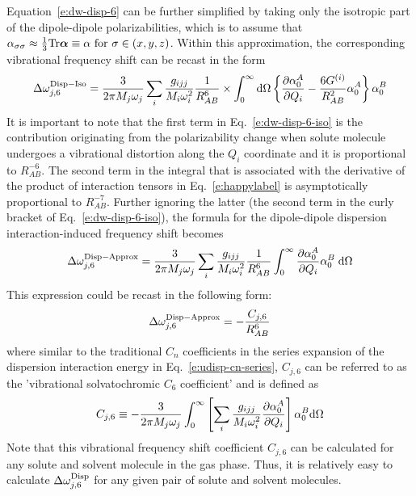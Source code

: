 \documentclass[a4paper,titlepage,twoside,fleqn,12pt]{book}
\newcommand{\BM}[1]{\bm{#1}}
\newcommand{\fderiv}[2]{\ensuremath{
\frac{\partial #1}{\partial #2}}}
\begin{document}
\begin{refsection}
Equation~\eqref{e:dw-disp-6} can be further simplified by taking only the isotropic 
part of the dipole\hyp{}dipole polarizabilities, which is to assume that 
$\alpha_{\sigma\sigma} \approx \frac{1}{3}{\rm Tr}{\BM\alpha} \equiv \alpha \text{ for } \sigma \in (x, y, z)$. 
Within this approximation, the corresponding vibrational frequency shift 
can be recast in the form
%
\begin{equation} \label{e:dw-disp-6-iso}
\Delta \omega_{j,6}^{\rm Disp-Iso} = \frac{3}{2\pi M_j\omega_j}
\sum_i \frac{g_{ijj}}{M_i\omega_i^2} 
\frac{1}{R^6_{AB}} \times
\int_{0}^{\infty} {\rm d}\Omega \left\{ 
\frac{\partial \alpha_0^{A}}{\partial Q_i}- 
\frac{6G^{(i)}}{R^2_{AB}} 
\alpha_0^{A}
\right\}
\alpha_0^{B} 
\end{equation}
%
It is important to note that the first term in Eq.~\eqref{e:dw-disp-6-iso} 
is the contribution originating from the polarizability change 
when solute molecule undergoes a vibrational distortion 
along the $Q_i$ coordinate and it is proportional to $R^{-6}_{AB}$. 
The second term in the integral that is associated with the derivative 
of the product of interaction tensors in Eq.~\eqref{e:happylabel}
is asymptotically proportional to $R^{-7}_{AB}$. Further ignoring the latter 
(the second term in the curly bracket of Eq.~\eqref{e:dw-disp-6-iso}), 
the formula for the dipole\hyp{}dipole dispersion interaction\hyp{}induced 
frequency shift becomes
%
\begin{equation} \label{e:dw-disp-6-iso-approx}
\Delta \omega_{j,6}^{\rm Disp-Approx} = \frac{3}{2\pi M_j\omega_j}
\sum_i \frac{g_{ijj}}{M_i\omega_i^2} 
\frac{1}{R^6_{AB}} 
\int_{0}^{\infty} 
\frac{\partial \alpha_0^{A}}{\partial Q_i}
\alpha_0^{B}  \;{\rm d}\Omega  
\end{equation}
%
This expression could be recast in the following form: 
%
\begin{equation} \label{e:dw-disp-6-iso-approx-cj6}
\Delta \omega_{j,6}^{\rm Disp-Approx} = 
 - \frac{C_{j,6}}{R_{AB}^6}
\end{equation}
%
where similar to the traditional $C_n$ coefficients 
in the series expansion of the dispersion interaction 
energy in Eq.~\eqref{e:udisp-cn-series}, $C_{j,6}$ 
can be referred to as 
the 'vibrational solvatochromic $C_6$ coefficient' 
and is defined as
%
\begin{equation} \label{e:cj6}
C_{j,6} \equiv
-\frac{3}{2\pi M_j\omega_j} 
\int_{0}^{\infty} 
\left[
\sum_i \frac{g_{ijj}}{M_i\omega_i^2} 
\fderiv{\alpha_0^{A}}{Q_i}
\right]
\alpha_0^{B} 
{\rm d}\Omega  
\end{equation}
%
Note that this vibrational frequency shift coefficient 
$C_{j,6}$ can be calculated for any solute and solvent 
molecule in the gas phase. Thus, it is relatively easy 
to calculate $\Delta \omega_{j,6}^{\rm Disp}$ for any 
given pair of solute and solvent molecules.


\end{refsection}
\end{document}
